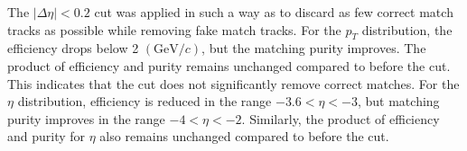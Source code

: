             The \( |\Delta \eta| < 0.2 \) cut was applied in such a way as to discard as few correct match tracks as possible while removing fake match tracks. For the \( p_T \) distribution, the efficiency drops below 2 $(\mathrm{GeV}/c)$, but the matching purity improves. The product of efficiency and purity remains unchanged compared to before the cut. This indicates that the cut does not significantly remove correct matches. For the \(\eta\) distribution, efficiency is reduced in the range \( -3.6 < \eta < -3 \), but matching purity improves in the range \( -4 < \eta < -2 \). Similarly, the product of efficiency and purity for \(\eta\) also remains unchanged compared to before the cut.